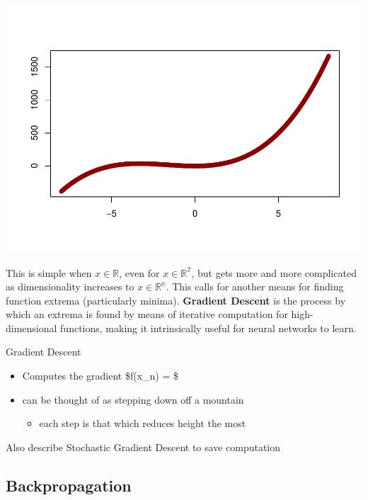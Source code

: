 \documentclass[
]{article}
\providecommand{\tightlist}{%
  \setlength{\itemsep}{0pt}\setlength{\parskip}{0pt}}
\begin{document}
\includegraphics{ANN_files/unnamed-chunk-3-1.pdf}

This is simple when \(x \in \mathbb{R}\), even for
\(x \in \mathbb{R^2}\), but gets more and more complicated as
dimensionality increases to \(x \in \mathbb{R^n}\). This calls for
another means for finding function extrema (particularly minima).
\textbf{Gradient Descent} is the process by which an extrema is found by
means of iterative computation for high-dimensional functions, making it
intrinsically useful for neural networks to learn.

Gradient Descent

\begin{itemize}
\tightlist
\item
  Computes the gradient \$\nabla f(x\_n) =
   \$
\item
  can be thought of as stepping down off a mountain

  \begin{itemize}
  \tightlist
  \item
    each step is that which reduces height the most
  \end{itemize}
\end{itemize}

Also describe Stochastic Gradient Descent to save computation

\hypertarget{backpropagation}{%
\subsection{Backpropagation}\label{backpropagation}}
\end{document}
